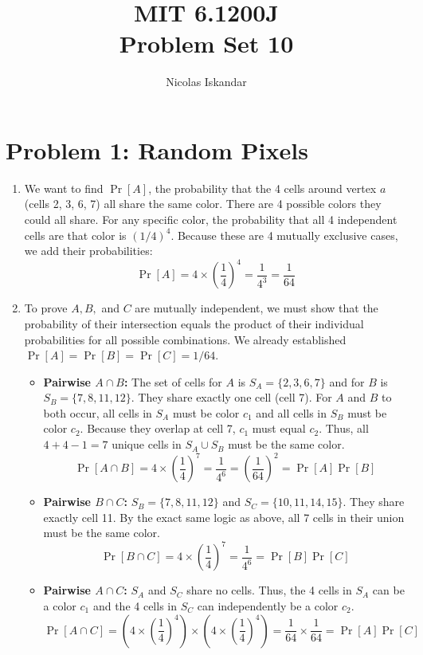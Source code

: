 \documentclass[11pt]{article}
\title{
    \vspace{-2em}
    MIT 6.1200J \\
    Problem Set 10
}
\author{Nicolas Iskandar}
\date{}
\begin{document}
\maketitle

\section*{Problem 1: Random Pixels}
\begin{enumerate}[label=\textbf{(\alph*)}]
    \item We want to find $\Pr[A]$, the probability that the 4 cells around vertex $a$ (cells 2, 3, 6, 7) all share the same color. 
    There are 4 possible colors they could all share. For any specific color, the probability that all 4 independent cells are that color is $(1/4)^4$. 
    Because these are 4 mutually exclusive cases, we add their probabilities:
    $$\Pr[A] = 4 \times \left(\frac{1}{4}\right)^4 = \frac{1}{4^3} = \frac{1}{64}$$

    \item To prove $A, B,$ and $C$ are mutually independent, we must show that the probability of their intersection equals the product of their individual probabilities for all possible combinations. We already established $\Pr[A] = \Pr[B] = \Pr[C] = 1/64$.
    
    \begin{itemize}
        \item \textbf{Pairwise $A \cap B$:} The set of cells for $A$ is $S_A = \{2, 3, 6, 7\}$ and for $B$ is $S_B = \{7, 8, 11, 12\}$. They share exactly one cell (cell 7). For $A$ and $B$ to both occur, all cells in $S_A$ must be color $c_1$ and all cells in $S_B$ must be color $c_2$. Because they overlap at cell 7, $c_1$ must equal $c_2$. Thus, all $4+4-1=7$ unique cells in $S_A \cup S_B$ must be the same color. 
        $$\Pr[A \cap B] = 4 \times \left(\frac{1}{4}\right)^7 = \frac{1}{4^6} = \left(\frac{1}{64}\right)^2 = \Pr[A]\Pr[B]$$
        
        \item \textbf{Pairwise $B \cap C$:} $S_B = \{7, 8, 11, 12\}$ and $S_C = \{10, 11, 14, 15\}$. They share exactly cell 11. By the exact same logic as above, all 7 cells in their union must be the same color.
        $$\Pr[B \cap C] = 4 \times \left(\frac{1}{4}\right)^7 = \frac{1}{4^6} = \Pr[B]\Pr[C]$$

        \item \textbf{Pairwise $A \cap C$:} $S_A$ and $S_C$ share no cells. Thus, the 4 cells in $S_A$ can be a color $c_1$ and the 4 cells in $S_C$ can independently be a color $c_2$. 
        $$\Pr[A \cap C] = \left( 4 \times \left(\frac{1}{4}\right)^4 \right) \times \left( 4 \times \left(\frac{1}{4}\right)^4 \right) = \frac{1}{64} \times \frac{1}{64} = \Pr[A]\Pr[C]$$


\end{itemize}
\end{enumerate}
\end{document}
